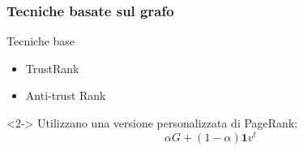 \documentclass{beamer}
\begin{document}
\begin{frame}
  \frametitle{Tecniche basate sul grafo}
  \begin{block}{Tecniche base}
  \begin{itemize}
  \item TrustRank
  \item Anti-trust Rank
  \end{itemize}
  \end{block}
  \begin{block}<2->{}
  Utilizzano una versione personalizzata di PageRank:
  \begin{equation}
   \alpha G + (1-\alpha)\textbf{1}v^t
   \label{eqn:pagerank}
  \end{equation}
  \end{block}
  \end{frame}
\end{document}

